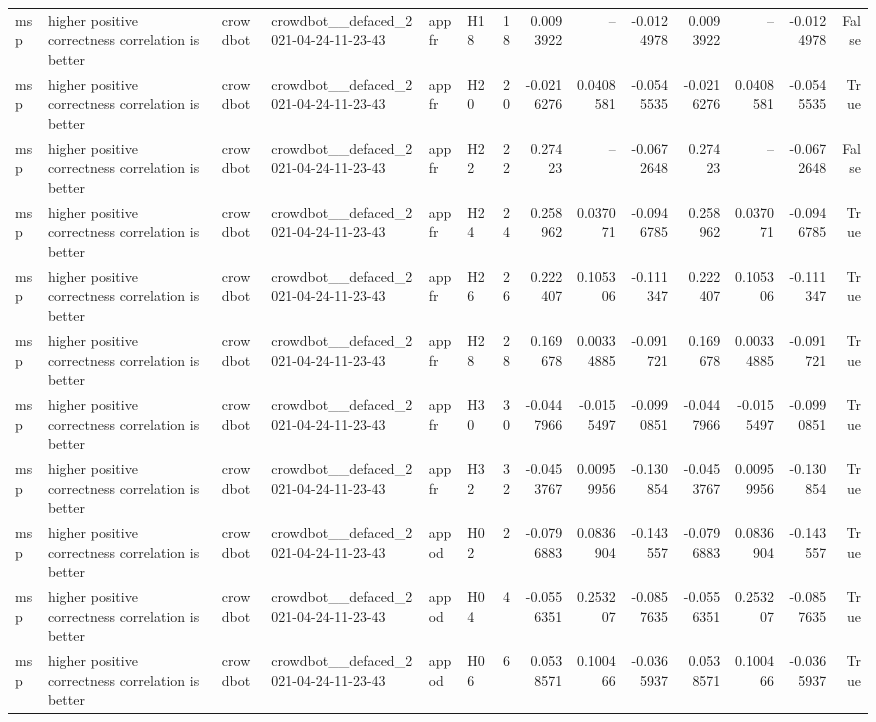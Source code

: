 \begin{longtable}{llllllrrrrrrrr}
msp & higher positive correctness correlation is better & crowdbot & crowdbot\_\_defaced\_2021-04-24-11-23-43 & appfr & H18 & 18 & 0.0093922 & -- & -0.0124978 & 0.0093922 & -- & -0.0124978 & False \\
msp & higher positive correctness correlation is better & crowdbot & crowdbot\_\_defaced\_2021-04-24-11-23-43 & appfr & H20 & 20 & -0.0216276 & 0.0408581 & -0.0545535 & -0.0216276 & 0.0408581 & -0.0545535 & True \\
msp & higher positive correctness correlation is better & crowdbot & crowdbot\_\_defaced\_2021-04-24-11-23-43 & appfr & H22 & 22 & 0.27423 & -- & -0.0672648 & 0.27423 & -- & -0.0672648 & False \\
msp & higher positive correctness correlation is better & crowdbot & crowdbot\_\_defaced\_2021-04-24-11-23-43 & appfr & H24 & 24 & 0.258962 & 0.037071 & -0.0946785 & 0.258962 & 0.037071 & -0.0946785 & True \\
msp & higher positive correctness correlation is better & crowdbot & crowdbot\_\_defaced\_2021-04-24-11-23-43 & appfr & H26 & 26 & 0.222407 & 0.105306 & -0.111347 & 0.222407 & 0.105306 & -0.111347 & True \\
msp & higher positive correctness correlation is better & crowdbot & crowdbot\_\_defaced\_2021-04-24-11-23-43 & appfr & H28 & 28 & 0.169678 & 0.00334885 & -0.091721 & 0.169678 & 0.00334885 & -0.091721 & True \\
msp & higher positive correctness correlation is better & crowdbot & crowdbot\_\_defaced\_2021-04-24-11-23-43 & appfr & H30 & 30 & -0.0447966 & -0.0155497 & -0.0990851 & -0.0447966 & -0.0155497 & -0.0990851 & True \\
msp & higher positive correctness correlation is better & crowdbot & crowdbot\_\_defaced\_2021-04-24-11-23-43 & appfr & H32 & 32 & -0.0453767 & 0.00959956 & -0.130854 & -0.0453767 & 0.00959956 & -0.130854 & True \\
msp & higher positive correctness correlation is better & crowdbot & crowdbot\_\_defaced\_2021-04-24-11-23-43 & appod & H02 & 2 & -0.0796883 & 0.0836904 & -0.143557 & -0.0796883 & 0.0836904 & -0.143557 & True \\
msp & higher positive correctness correlation is better & crowdbot & crowdbot\_\_defaced\_2021-04-24-11-23-43 & appod & H04 & 4 & -0.0556351 & 0.253207 & -0.0857635 & -0.0556351 & 0.253207 & -0.0857635 & True \\
msp & higher positive correctness correlation is better & crowdbot & crowdbot\_\_defaced\_2021-04-24-11-23-43 & appod & H06 & 6 & 0.0538571 & 0.100466 & -0.0365937 & 0.0538571 & 0.100466 & -0.0365937 & True \\

\end{longtable}
